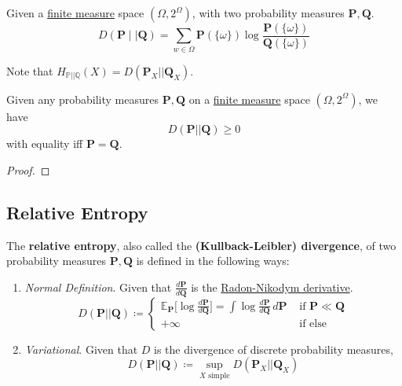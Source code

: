   \begin{definition}[Divergence]
    \label{def:divergence}
    Given a \hyperref[mt-def:finite-measure]{finite measure} space $(\Omega, 2^\Omega)$, with two probability measures $\mathbf{P}, \mathbf{Q}$. 
    \begin{equation}
      D(\mathbf{P} \mid \mid \mathbf{Q}) = \sum_{w \in \Omega} \mathbf{P}(\{\omega\}) \log \frac{\mathbf{P}(\{\omega\})}{\mathbf{Q}(\{\omega\})}
    \end{equation}
  \end{definition}

  Note that $H_{\mathbb{P} || \mathbb{Q}} (X) = D(\mathbf{P}_X || \mathbf{Q}_X)$. 

  \begin{lemma}
    \label{thm:divergence-is-nonnegative}
    Given any probability measures $\mathbf{P}, \mathbf{Q}$ on a \hyperref[mt-def:finite-measure]{finite measure} space $(\Omega, 2^\Omega)$, we have 
    \begin{equation}
      D(\mathbf{P} || \mathbf{Q}) \geq 0
    \end{equation}
    with equality iff $\mathbf{P} = \mathbf{Q}$. 
  \end{lemma}
  \begin{proof}
    
  \end{proof}

\subsection{Relative Entropy} 

  \begin{definition}
    \label{def:relative-entropy}
    The \textbf{relative entropy}, also called the \textbf{(Kullback-Leibler) divergence}, of two probability measures $\mathbf{P}, \mathbf{Q}$ is defined in the following ways: 
    \begin{enumerate}
      \item \textit{Normal Definition}. Given that $\frac{d\mathbf{P}}{d\mathbf{Q}}$ is the \hyperref[mt-thm:rn-der]{Radon-Nikodym derivative}. 
        \begin{equation}
          D(\mathbf{P} || \mathbf{Q}) \coloneqq \begin{cases} 
            \mathbb{E}_{\mathbf{P}} \bigg[ \log \frac{d \mathbf{P}}{d \mathbf{Q}} \bigg] = \int \log \frac{d \mathbf{P}}{d\mathbf{Q}} \, d\mathbf{P} & \text{ if } \mathbf{P} \ll \mathbf{Q} \\  
            +\infty & \text{ if else} 
          \end{cases}
        \end{equation}

      \item \textit{Variational}. Given that $D$ is the divergence of discrete probability measures,  
        \begin{equation}
          D (\mathbf{P} || \mathbf{Q}) \coloneqq \sup_{X \text{ simple}} D(\mathbf{P}_X || \mathbf{Q}_X)
        \end{equation}
    \end{enumerate}
  \end{definition} 

